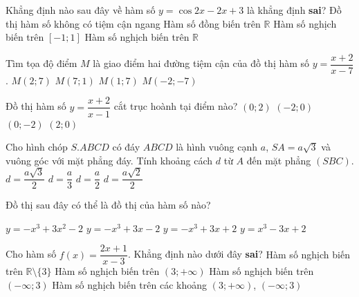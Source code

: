 \begin{ex}%
Khẳng định nào sau đây về hàm số $y=\cos 2x-2x+3$ là khẳng định \textbf{sai}?
\choice
{Đồ thị hàm số không có tiệm cận ngang}
{\True Hàm số đồng biến trên $\mathbb{R}$}
{Hàm số nghịch biến trên $[-1;1]$}
{Hàm số nghịch biến trên $\mathbb{R}$}
\end{ex}
\begin{ex}%
Tìm tọa độ điểm $M$ là giao điểm hai đường tiệm cận của đồ thị hàm số $y=\dfrac{x+2}{x-7}$.
\choice
{$M(2;7)$}
{\True $M(7;1)$}
{$M(1;7)$}
{$M(-2;-7)$}
\end{ex}
\begin{ex}%
Đồ thị hàm số $y=\dfrac{x+2}{x-1}$ cắt trục hoành tại điểm nào?
\choice
{$(0;2)$}
{\True $(-2;0)$}
{$(0;-2)$}
{$(2;0)$}
\end{ex}
\begin{ex}%
Cho hình chóp $S.ABCD$ có đáy $ABCD$ là hình vuông cạnh $a$, $SA=a\sqrt{3}$ và vuông góc với mặt phẳng đáy. Tính khoảng cách $d$ từ $A$ đến mặt phẳng $(SBC)$.
\choice
{\True $d=\dfrac{a\sqrt{3}}{2}$}
{$d=\dfrac{a}{3}$}
{$d=\dfrac{a}{2}$}
{$d=\dfrac{a\sqrt{2}}{2}$}
\end{ex}
\begin{ex}%
Đồ thị sau đây có thể là đồ thị của hàm số nào?
\begin{center}
\end{center}
\choice
{$y=-x^3+3x^2-2$}
{$y=-x^3+3x-2$}
{\True $y=-x^3+3x+2$}
{$y=x^3-3x+2$}
\end{ex}
\begin{ex}%
Cho hàm số $f(x)=\dfrac{2x+1}{x-3}$. Khẳng định nào dưới đây \textbf{sai}?
\choice
{\True Hàm số nghịch biến trên $\mathbb{R}\setminus\{3\}$}
{Hàm số nghịch biến trên $(3;+\infty)$}
{Hàm số nghịch biến trên $(-\infty;3)$}
{Hàm số nghịch biến trên các khoảng $(3;+\infty)$, $(-\infty;3)$}
\end{ex}
